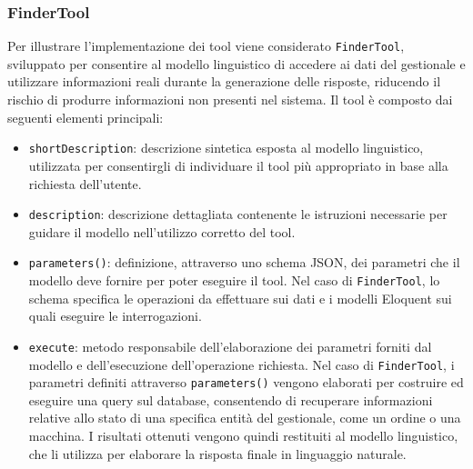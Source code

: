 \subsubsection*{FinderTool}
Per illustrare l'implementazione dei tool viene considerato \texttt{FinderTool}, sviluppato per consentire al modello linguistico di accedere ai dati del gestionale e 
utilizzare informazioni reali durante la generazione delle risposte, riducendo il rischio di produrre informazioni non presenti nel sistema.
\newline
Il tool è composto dai seguenti elementi principali:
\begin{itemize}
  \item \texttt{shortDescription}: descrizione sintetica esposta al modello linguistico, utilizzata per consentirgli di individuare il tool più appropriato in base alla 
    richiesta dell'utente.
  \item \texttt{description}: descrizione dettagliata contenente le istruzioni necessarie per guidare il modello nell'utilizzo corretto del tool.
  \item \texttt{parameters()}: definizione, attraverso uno schema JSON, dei parametri che il modello deve fornire per poter eseguire il tool. Nel caso di \texttt{FinderTool}, 
    lo schema specifica le operazioni da effettuare sui dati e i modelli Eloquent sui quali eseguire le interrogazioni.
  \item \texttt{execute}: metodo responsabile dell'elaborazione dei parametri forniti dal modello e dell'esecuzione dell'operazione richiesta. Nel caso di \texttt{FinderTool}, i 
    parametri definiti attraverso \texttt{parameters()} vengono elaborati per costruire ed eseguire una query sul database, consentendo di recuperare informazioni relative allo 
    stato di una specifica entità del gestionale, come un ordine o una macchina. I risultati ottenuti vengono quindi restituiti al modello linguistico, che li utilizza per 
    elaborare la risposta finale in linguaggio naturale.
\end{itemize}

